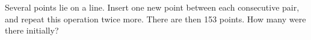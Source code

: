 Several points lie on a line. Insert one new point between each consecutive pair, and repeat this operation twice more. There are then 153 points. How many were there initially?
